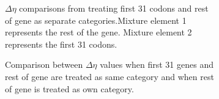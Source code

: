 \documentclass[11pt]{labbook}
\begin{document}
\begin{figure}
\begin{center}
\begin{subfigure}{0.6\textwidth}
\caption{$\Delta\eta$ comparisons from treating first 31 codons and rest of gene as separate categories.Mixture element 1 represents the rest of the gene. Mixture element 2 represents the first 31 codons.}
\end{subfigure}%
\end{center}
\begin{subfigure}{0.52\textwidth}
\caption{Comparison between $\Delta\eta$ values when first 31 genes and rest of gene are treated as same category and when rest of gene is treated as own category.}
\end{subfigure}%
\begin{subfigure}{0.52\textwidth}

\end{subfigure}
\end{figure}
\end{document}
